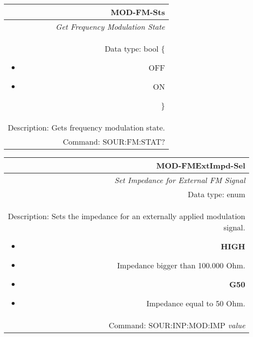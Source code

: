 \documentclass[openany]{article}
\begin{document}
		\begin{tabular}{N}
			\hline
			\bfseries MOD-FM-Sts \\ \hline
			\emph{Get Frequency Modulation State} \\
			Data type: bool \{\begin{itemize}[noitemsep]
				\small
				\item[] OFF
				\item[] ON
			\end{itemize}\} \\
			Description: Gets frequency modulation state. \\
			Command: SOUR:FM:STAT? \\
			
		\end{tabular}
%
		\begin{tabular}{N}
			\hline
			\bfseries MOD-FMExtImpd-Sel \\ \hline
			\emph{Set Impedance for External FM Signal} \\
			Data type: enum \\  
			Description: Sets the impedance for an externally applied modulation signal.\begin{itemize}[noitemsep]
				\small
				\item[] \textbf{HIGH}
                                \item[] Impedance bigger than 100.000 Ohm.
                                \item[] \textbf{G50}
                                \item[] Impedance equal to 50 Ohm.
			\end{itemize} \\
			Command: SOUR:INP:MOD:IMP \emph{value} \\

		\end{tabular}
\end{document}
